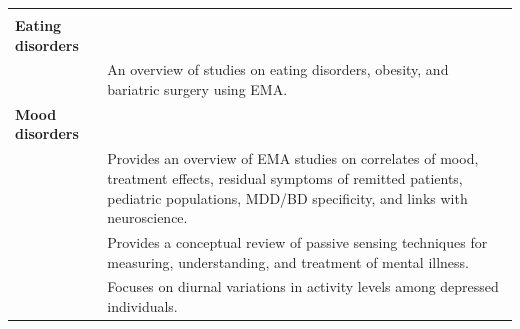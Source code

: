 \documentclass[]{book}
\begin{document}
\begin{longtable}[]{@{}ll@{}}
\begin{minipage}[t]{0.61\columnwidth}
\end{minipage}\tabularnewline
\begin{minipage}[t]{0.33\columnwidth}\raggedright\strut
\textbf{Eating disorders}\strut
\end{minipage} & \begin{minipage}[t]{0.61\columnwidth}\raggedright\strut
\strut
\end{minipage}\tabularnewline
\begin{minipage}[t]{0.33\columnwidth}\raggedright\strut
\citet{Engel2016}\strut
\end{minipage} & \begin{minipage}[t]{0.61\columnwidth}\raggedright\strut
An overview of studies on eating disorders, obesity, and bariatric
surgery using EMA.\strut
\end{minipage}\tabularnewline
\begin{minipage}[t]{0.33\columnwidth}\raggedright\strut
\textbf{Mood disorders}\strut
\end{minipage} & \begin{minipage}[t]{0.61\columnwidth}\raggedright\strut
\strut
\end{minipage}\tabularnewline
\begin{minipage}[t]{0.33\columnwidth}\raggedright\strut
\citet{AanhetRot2012}\strut
\end{minipage} & \begin{minipage}[t]{0.61\columnwidth}\raggedright\strut
Provides an overview of EMA studies on correlates of mood, treatment
effects, residual symptoms of remitted patients, pediatric populations,
MDD/BD specificity, and links with neuroscience.\strut
\end{minipage}\tabularnewline
\begin{minipage}[t]{0.33\columnwidth}\raggedright\strut
\citet{Aung2017}\strut
\end{minipage} & \begin{minipage}[t]{0.61\columnwidth}\raggedright\strut
Provides a conceptual review of passive sensing techniques for
measuring, understanding, and treatment of mental illness.\strut
\end{minipage}\tabularnewline
\begin{minipage}[t]{0.33\columnwidth}\raggedright\strut
\citet{burton2013}\strut
\end{minipage} & \begin{minipage}[t]{0.61\columnwidth}\raggedright\strut
Focuses on diurnal variations in activity levels among depressed
individuals.\strut
\end{minipage}\tabularnewline

\end{longtable}
\end{document}

